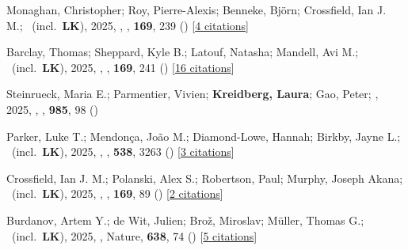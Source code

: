 \item[{\color{numcolor}\scriptsize136}] Monaghan, Christopher; Roy, Pierre-Alexis; Benneke, Bj{\"o}rn; Crossfield, Ian J. M.; \etal\ (incl.\ \textbf{LK}), 2025, , \aj, \textbf{169}, 239 () [\href{https://ui.adsabs.harvard.edu/abs/2025AJ....169..239M}{4 citations}]

\item[{\color{numcolor}\scriptsize135}] Barclay, Thomas; Sheppard, Kyle B.; Latouf, Natasha; Mandell, Avi M.; \etal\ (incl.\ \textbf{LK}), 2025, , \aj, \textbf{169}, 241 () [\href{https://ui.adsabs.harvard.edu/abs/2025AJ....169..241B}{16 citations}]

\item[{\color{numcolor}\scriptsize134}] Steinrueck, Maria E.; Parmentier, Vivien; \textbf{Kreidberg, Laura}; Gao, Peter; \etal, 2025, , \apj, \textbf{985}, 98 ()

\item[{\color{numcolor}\scriptsize133}] Parker, Luke T.; Mendon{\c{c}}a, Jo{\~a}o M.; Diamond-Lowe, Hannah; Birkby, Jayne L.; \etal\ (incl.\ \textbf{LK}), 2025, , \mnras, \textbf{538}, 3263 () [\href{https://ui.adsabs.harvard.edu/abs/2025MNRAS.538.3263P}{3 citations}]

\item[{\color{numcolor}\scriptsize132}] Crossfield, Ian J. M.; Polanski, Alex S.; Robertson, Paul; Murphy, Joseph Akana; \etal\ (incl.\ \textbf{LK}), 2025, , \aj, \textbf{169}, 89 () [\href{https://ui.adsabs.harvard.edu/abs/2025AJ....169...89C}{2 citations}]

\item[{\color{numcolor}\scriptsize131}] Burdanov, Artem Y.; de Wit, Julien; Bro{\v{z}}, Miroslav; M{\"u}ller, Thomas G.; \etal\ (incl.\ \textbf{LK}), 2025, , Nature, \textbf{638}, 74 () [\href{https://ui.adsabs.harvard.edu/abs/2025Natur.638...74B}{5 citations}]

